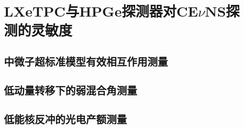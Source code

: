 
\chapter{LXeTPC与HPGe探测器对CE$\nu$NS探测的灵敏度}

\section{中微子超标准模型有效相互作用测量}

\section{低动量转移下的弱混合角测量}

\section{低能核反冲的光电产额测量}
